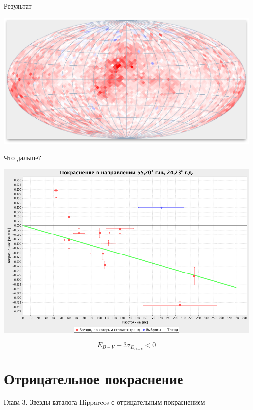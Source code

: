 \documentclass[14pt, fleqn, xcolor={dvipsnames, table}]{beamer}
\begin{document}
        \begin{frame}{Результат}
            \begin{center}
                \includegraphics[scale=0.32]{map-k.png}
            \end{center}             
        \end{frame}
        
        \begin{frame}{Что дальше?}
            \begin{center}
                \includegraphics[scale=0.3]{next-k.png}
            \end{center}  
            $$E_{B - V} + 3 \sigma_{E_{B - V}} < 0$$
        \end{frame} 
        
	
	 \section{Отрицательное покраснение}          
        
        \begin{frame}
            Глава 3. Звезды каталога Hipparcos с отрицательным покраснением 
        \end{frame}		    
        
\end{document}
